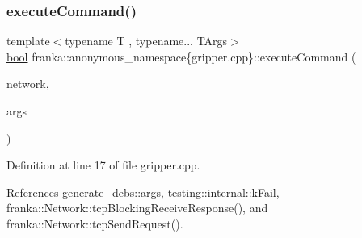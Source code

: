 \subsubsection{\texorpdfstring{execute\+Command()}{executeCommand()}}
{\footnotesize\ttfamily template$<$typename T , typename... T\+Args$>$ \\
\hyperlink{classbool}{bool} franka\+::anonymous\+\_\+namespace\{gripper.\+cpp\}\+::execute\+Command (\begin{DoxyParamCaption}\item[{\hyperlink{classfranka_1_1Network}{Network} \&}]{network,  }\item[{T\+Args \&\&...}]{args }\end{DoxyParamCaption})}



Definition at line 17 of file gripper.\+cpp.



References generate\+\_\+debs\+::args, testing\+::internal\+::k\+Fail, franka\+::\+Network\+::tcp\+Blocking\+Receive\+Response(), and franka\+::\+Network\+::tcp\+Send\+Request().


